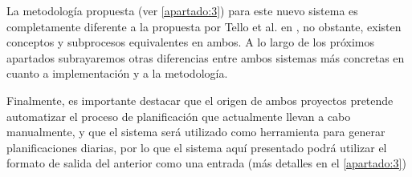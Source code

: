 La metodología propuesta (ver \autoref{apartado:3}) para este nuevo sistema es completamente diferente a la propuesta por Tello et al. en \cite{articulo1}, no obstante, existen conceptos y subprocesos equivalentes en ambos. 
A lo largo de los próximos apartados subrayaremos otras diferencias entre ambos sistemas más concretas en cuanto a implementación y a la metodología.

Finalmente, es importante destacar que el origen de ambos proyectos pretende automatizar el proceso de planificación que actualmente llevan a cabo manualmente, y que el sistema \legacy{} será utilizado como herramienta para generar planificaciones diarias, por lo que el sistema aquí presentado podrá utilizar el formato de salida del anterior como una entrada (más detalles en el \autoref{apartado:3}) 



